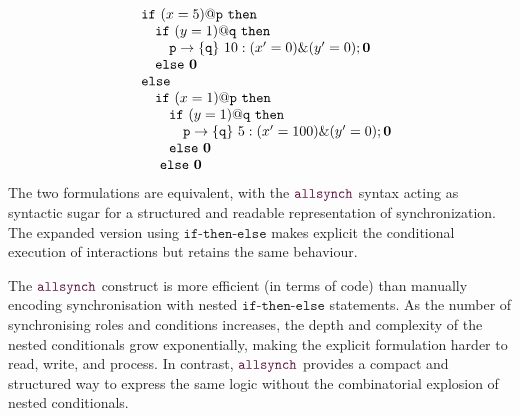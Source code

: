 \begin{itemize}
  \begin{displaymath}
    \begin{array}{ll}
      & \mathtt{if}\ (x=5)@\mathtt{p}\ \mathtt{then}\\
      & \quad \mathtt{if}\ (y=1)@\mathtt{q}\ \mathtt{then}\\
      & \quad \quad \mathtt{p}\rightarrow \{\mathtt{q}\}\ 10 : (x'=0)\&(y'=0);\mathbf{0} \\
      & \quad \mathtt{else}\ \mathbf{0} \\
      & \mathtt{else}\\
      & \quad \mathtt{if}\ (x=1)@\mathtt{p}\ \mathtt{then}\\
      & \quad\quad \mathtt{if}\ (y=1)@\mathtt{q}\ \mathtt{then}\\
      & \quad\quad \quad \mathtt{p}\rightarrow \{\mathtt{q}\}\ 5 : (x'=100)\&(y'=0);\mathbf{0} \\
      & \quad\quad \mathtt{else}\ \mathbf{0} \\
      & \quad\ \mathtt{else}\ \mathbf{0} \\
    \end{array}
  \end{displaymath}
  The two formulations are equivalent, with the $\allsynchName$ syntax
  acting as syntactic sugar for a structured and readable
  representation of synchronization. The expanded version using
  $\mathtt{if\text{-}then\text{-}else}$ makes explicit the conditional
  execution of interactions but retains the same behaviour.

  The $\allsynchName$ construct is more efficient (in terms of code)
  than manually encoding synchronisation with nested
  $\mathtt{if\text{-}then\text{-}else}$ statements.  As the number of
  synchronising roles and conditions increases, the depth and
  complexity of the nested conditionals grow exponentially, making the
  explicit formulation harder to read, write, and process.  In
  contrast, $\allsynchName$ provides a compact and structured way to
  express the same logic without the combinatorial explosion of nested
  conditionals.
\end{itemize}

  



